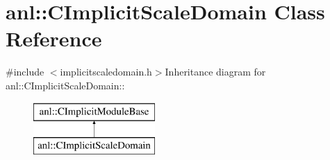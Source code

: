 \hypertarget{classanl_1_1CImplicitScaleDomain}{
\section{anl::CImplicitScaleDomain Class Reference}
\label{classanl_1_1CImplicitScaleDomain}
}


{\ttfamily \#include $<$implicitscaledomain.h$>$}Inheritance diagram for anl::CImplicitScaleDomain::\begin{figure}[H]
\begin{center}
\leavevmode
\includegraphics[height=2cm]{classanl_1_1CImplicitScaleDomain}
\end{center}
\end{figure}
